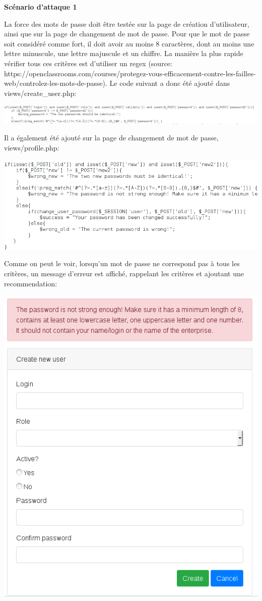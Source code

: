 \documentclass{article}
\begin{document}
\textbf{Scénario d'attaque 1}

La force des mots de passe doit être testée sur la page de création
d'utilisateur, ainsi que sur la page de changement de mot de passe. Pour
que le mot de passe soit considéré comme fort, il doit avoir au moins 8
caractères, dont au moins une lettre minuscule, une lettre majuscule et
un chiffre. La manière la plus rapide vérifier tous ces critères est
d'utiliser un regex (source:
https://openclassrooms.com/courses/protegez-vous-efficacement-contre-les-failles-web/controlez-les-mots-de-passe).
Le code suivant a donc été ajouté dans views/create\_user.php:

\includegraphics{images/password.PNG}

Il a également été ajouté sur la page de changement de mot de passe,
views/profile.php:

\includegraphics{images/password3.PNG}

Comme on peut le voir, lorsqu'un mot de passe ne correspond pas à tous
les critères, un message d'erreur est affiché, rappelant les critères et
ajoutant une recommendation:

\includegraphics{images/password2.PNG}
\end{document}
